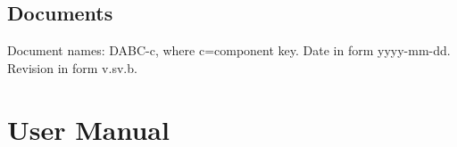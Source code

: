 \documentclass{dabcclass}
\begin{document}
 \cleardoublepage
\thispagestyle{empty} \tableofcontents \thispagestyle{empty} \cleardoublepage
{}


\setcounter{chapter}{0}
\chapter{Documents}
Document names: DABC-c, where c=component key. Date in form yyyy-mm-dd.
Revision in form v.sv.b.\\

%



%
%

%
%
\cleardoublepage
\part{User Manual}
 \cleardoublepage
\end{document}
